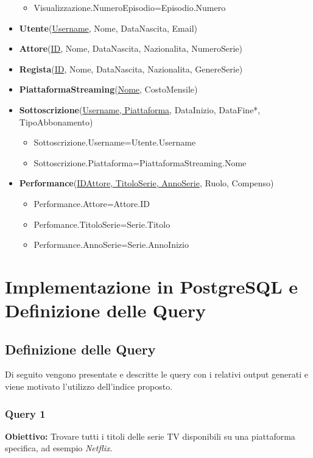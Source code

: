 \documentclass[12pt,a4paper]{article}
\begin{document}
\begin{itemize}
\begin{itemize}
        \item Visualizzazione.NumeroEpisodio=Episodio.Numero
    \end{itemize}
    \item \textbf{Utente}(\underline{Username}, Nome, DataNascita, Email)
    \item \textbf{Attore}(\underline{ID}, Nome, DataNascita, Nazionalita, NumeroSerie)
    \item \textbf{Regista}(\underline{ID}, Nome, DataNascita, Nazionalita, GenereSerie)
    \item \textbf{PiattaformaStreaming}(\underline{Nome}, CostoMensile)
    \item \textbf{Sottoscrizione}(\underline{Username, Piattaforma}, DataInizio, DataFine*, TipoAbbonamento)
    \begin{itemize}
        \item Sottoscrizione.Username=Utente.Username
        \item Sottoscrizione.Piattaforma=PiattaformaStreaming.Nome
    \end{itemize}
    \item \textbf{Performance}(\underline{IDAttore, TitoloSerie, AnnoSerie}, Ruolo, Compenso)
    \begin{itemize}
        \item Performance.Attore=Attore.ID
        \item Perfomance.TitoloSerie=Serie.Titolo
        \item Performance.AnnoSerie=Serie.AnnoInizio
    \end{itemize}
\end{itemize}


\section{Implementazione in PostgreSQL e Definizione delle Query}

\subsection*{Definizione delle Query}

Di seguito vengono presentate e descritte le query con i relativi output generati e 
viene motivato l’utilizzo dell’indice proposto.

\vspace{1cm}

\subsubsection*{Query 1}
\textbf{Obiettivo:} Trovare tutti i titoli delle serie TV disponibili su una piattaforma specifica, ad esempio \textit{Netflix}.
\end{document}
